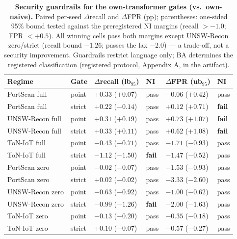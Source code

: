 \begin{table}
\centering
\caption{\textbf{Security guardrails for the own-transformer gates (vs.\ own-naive).}
Paired per-seed $\Delta$recall and $\Delta$FPR (pp); parentheses: one-sided 95\% bound
tested against the preregistered NI margins (recall $>-1.0$; FPR $<+0.5$). All winning cells
pass both margins except UNSW-Recon zero/strict (recall bound $-1.26$; passes the lax $-2.0$)
--- a trade-off, not a security improvement. Guardrails restrict language only; BA determines
the registered classification (registered protocol, Appendix A, in the artifact).}
\label{tab:symmetric_security}
\footnotesize
\begin{tabular}{l l l l l l}
\toprule
Regime & Gate & $\Delta$recall (lb$_{95}$) & NI & $\Delta$FPR (ub$_{95}$) & NI \\
\midrule
PortScan full & point & $+0.33$ ($+0.07$) & pass & $-0.06$ ($+0.42$) & pass \\
PortScan full & strict & $+0.22$ ($-0.14$) & pass & $+0.12$ ($+0.71$) & \textbf{fail} \\
\addlinespace
UNSW-Recon full & point & $+0.31$ ($+0.19$) & pass & $+0.73$ ($+1.07$) & \textbf{fail} \\
UNSW-Recon full & strict & $+0.33$ ($+0.11$) & pass & $+0.62$ ($+1.08$) & \textbf{fail} \\
\addlinespace
ToN-IoT full & point & $-0.43$ ($-0.71$) & pass & $-1.71$ ($-0.93$) & pass \\
ToN-IoT full & strict & $-1.12$ ($-1.50$) & \textbf{fail} & $-1.47$ ($-0.52$) & pass \\
\addlinespace
PortScan zero & point & $-0.02$ ($-0.07$) & pass & $-1.53$ ($-0.93$) & pass \\
PortScan zero & strict & $+0.02$ ($-0.02$) & pass & $-3.33$ ($-2.60$) & pass \\
\addlinespace
UNSW-Recon zero & point & $-0.63$ ($-0.92$) & pass & $-1.00$ ($-0.62$) & pass \\
UNSW-Recon zero & strict & $-0.99$ ($-1.26$) & \textbf{fail} & $-2.00$ ($-1.63$) & pass \\
\addlinespace
ToN-IoT zero & point & $-0.13$ ($-0.20$) & pass & $-0.35$ ($-0.18$) & pass \\
ToN-IoT zero & strict & $+0.10$ ($-0.07$) & pass & $-0.57$ ($-0.27$) & pass \\
\bottomrule
\end{tabular}
\end{table}
